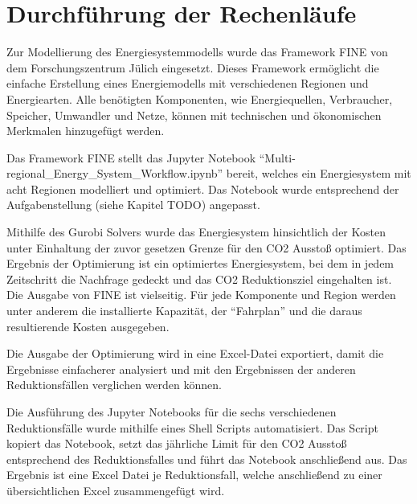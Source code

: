 \section{Durchführung der Rechenläufe}
Zur Modellierung des Energiesystemmodells wurde das Framework FINE von dem Forschungszentrum Jülich eingesetzt.
Dieses Framework ermöglicht die einfache Erstellung eines Energiemodells mit verschiedenen Regionen und Energiearten. Alle benötigten Komponenten, wie Energiequellen, Verbraucher, Speicher, Umwandler und Netze, können mit technischen und ökonomischen Merkmalen hinzugefügt werden. 

Das Framework FINE stellt das Jupyter Notebook ``Multi-regional\_Energy\_System\_Workflow.ipynb'' bereit, welches ein Energiesystem mit acht Regionen modelliert und optimiert. Das Notebook wurde entsprechend der Aufgabenstellung (siehe Kapitel TODO) angepasst.

Mithilfe des Gurobi Solvers wurde das Energiesystem hinsichtlich der Kosten unter Einhaltung der zuvor gesetzen Grenze für den CO2 Ausstoß optimiert. Das Ergebnis der Optimierung ist ein optimiertes Energiesystem, bei dem in jedem Zeitschritt die Nachfrage gedeckt und das CO2 Reduktionsziel eingehalten ist. Die Ausgabe von FINE ist vielseitig. Für jede Komponente und Region werden unter anderem die installierte Kapazität, der ``Fahrplan'' und die daraus resultierende Kosten ausgegeben.

Die Ausgabe der Optimierung wird in eine Excel-Datei exportiert, damit die Ergebnisse einfacherer analysiert und mit den Ergebnissen der anderen Reduktionsfällen verglichen werden können. 

Die Ausführung des Jupyter Notebooks für die sechs verschiedenen Reduktionsfälle wurde mithilfe eines Shell Scripts automatisiert. Das Script kopiert das Notebook, setzt das jährliche Limit für den CO2 Ausstoß entsprechend des Reduktionsfalles und führt das Notebook anschließend aus. Das Ergebnis ist eine Excel Datei je Reduktionsfall, welche anschließend zu einer übersichtlichen Excel zusammengefügt wird.